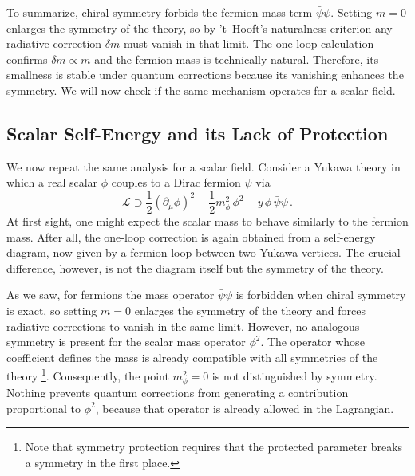 \documentclass[a4paper, 11pt]{article}
\begin{document}
To summarize, chiral symmetry forbids the fermion mass term $\bar{\psi}\psi$. Setting $m = 0$ enlarges the symmetry of the theory, so by 't~Hooft's naturalness criterion any radiative correction $\delta m$ must vanish in that limit. The one-loop calculation confirms $\delta m \propto m$ and the fermion mass is technically natural. Therefore, its smallness is stable under quantum corrections because its vanishing enhances the symmetry. We will now check if the same mechanism operates for a scalar field.


\subsection{Scalar Self-Energy and its Lack of Protection}
\label{sec:scalar}

We now repeat the same analysis for a scalar field. Consider a Yukawa theory in which a real scalar $\phi$ couples to a Dirac fermion $\psi$ via
\begin{equation*}
  \mathcal{L}
  \supset
  \frac{1}{2}(\partial_\mu\phi)^2
  - \frac{1}{2}m_\phi^2\,\phi^2
  - y\,\phi\,\bar\psi\psi\,.
\end{equation*}
At first sight, one might expect the scalar mass to behave similarly to the fermion mass. After all, the one-loop correction is again obtained from a self-energy diagram, now given by a fermion loop between two Yukawa vertices. The crucial difference, however, is not the diagram itself but the symmetry of the theory.

As we saw, for fermions the mass operator $\bar{\psi}\psi$ is forbidden when chiral symmetry is exact, so setting $m=0$ enlarges the symmetry of the theory and forces radiative corrections to vanish in the same limit. However, no analogous symmetry is present for the scalar mass operator $\phi^2$. The operator whose coefficient defines the mass is already compatible with all symmetries of the theory%
\footnote{Note that symmetry protection requires that the protected parameter breaks a symmetry in the first place.}. Consequently, the point $m_\phi^2 = 0$ is not distinguished by symmetry. Nothing prevents quantum corrections from generating a contribution proportional to $\phi^2$, because that operator is already allowed in the Lagrangian.
\end{document}
